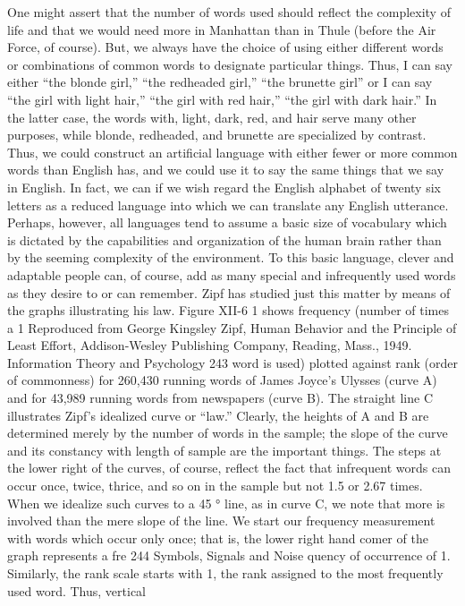 {{{{{{{{{{{{One might assert that the number of words used should reflect
the complexity of life and that we would need more in Manhattan
than in Thule (before the Air Force, of course). But, we always
have the choice of using either different words or combinations of
common words to designate particular things. Thus, I can say
either “the blonde girl,” “the redheaded girl,” “the brunette girl”
or I can say “the girl with light hair,” “the girl with red hair,” “the
girl with dark hair.” In the latter case, the words with, light, dark,
red, and hair serve many other purposes, while blonde, redheaded,
and brunette are specialized by contrast.
Thus, we could construct an artificial language with either fewer
or more common words than English has, and we could use it to
say the same things that we say in English. In fact, we can if we
wish regard the English alphabet of twenty six letters as a reduced
language into which we can translate any English utterance.
Perhaps, however, all languages tend to assume a basic size of
vocabulary which is dictated by the capabilities and organization
of the human brain rather than by the seeming complexity of the
environment. To this basic language, clever and adaptable people
can, of course, add as many special and infrequently used words
as they desire to or can remember.
Zipf has studied just this matter by means of the graphs illustrating
his law. Figure XII-6 1 shows frequency (number of times a
1 Reproduced from George Kingsley Zipf, Human Behavior and the Principle of
Least Effort, Addison-Wesley Publishing Company, Reading, Mass., 1949.
Information Theory and Psychology 243
word is used) plotted against rank (order of commonness) for
260,430 running words of James Joyce’s Ulysses (curve A) and for
43,989 running words from newspapers (curve B). The straight line
C illustrates Zipf’s idealized curve or “law.”
Clearly, the heights of A and B are determined merely by the
number of words in the sample; the slope of the curve and its
constancy with length of sample are the important things. The
steps at the lower right of the curves, of course, reflect the fact that
infrequent words can occur once, twice, thrice, and so on in the
sample but not 1.5 or 2.67 times.
When we idealize such curves to a 45 ° line, as in curve C, we
note that more is involved than the mere slope of the line. We start
our frequency measurement with words which occur only once;
that is, the lower right hand comer of the graph represents a fre
244
Symbols, Signals and Noise
quency of occurrence of 1. Similarly, the rank scale starts with 1,
the rank assigned to the most frequently used word. Thus, vertical
}}}}}}}}}}}}
